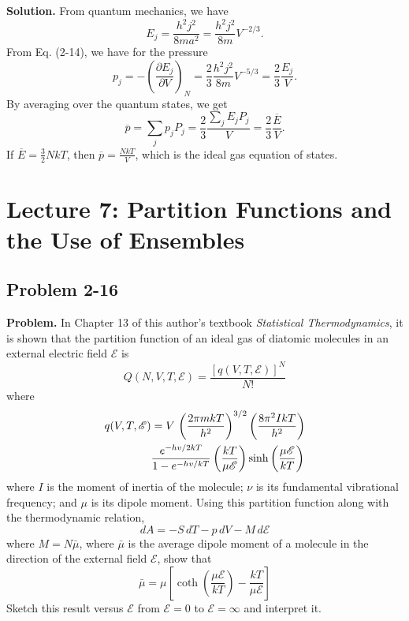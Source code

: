 \documentclass[twocolumn, 10pt]{article}
\numberwithin{equation}{section}
\newenvironment{problem}
{\par\medskip\sffamily \color{problue}
  \textbf{Problem. }\ignorespaces}
{\medskip}
\newenvironment{solution}
{\par\medskip
  \textbf{Solution. }\ignorespaces}
{\medskip}
\begin{document}
\begin{solution}
From quantum mechanics, we have
$$
E_j = \frac{ h^2 j^2 } { 8 m a^2 }
  =
  \frac{ h^2 j^2 } { 8 m } V^{-2/3}.
$$
From Eq. (2-14), we have for the pressure
$$
p_j = -\left( \frac{ \partial E_j } { \partial V } \right)_N
= \frac{2}{3} \frac{ h^2 j^2 } { 8 m } V^{-5/3}
= \frac{2}{3} \frac{ E_j } { V }.
$$
By averaging over the quantum states, we get
$$
  \overline p = \sum_j p_j P_j
  =
  \frac{2}{3} \frac{ \sum_j E_j P_j } { V}
  =
  \frac{2}{3} \frac{ \overline E } { V}.
$$
If $\overline E = \frac{3}{2} N k T$,
then $\overline p = \frac{ N k T } { V}$,
which is the ideal gas equation of states.
\end{solution}

\section{Lecture 7: Partition Functions and the Use of Ensembles}

\subsection{Problem 2-16}

\begin{problem}
In Chapter 13 of this author's textbook
\emph{Statistical Thermodynamics},
it is shown that the partition function of an ideal gas of diatomic molecules
in an external electric field $\mathscr E$ is
$$
Q(N, V, T, \mathscr E) = \frac{ [q(V, T, \mathscr E)]^N } { N! }
$$
where
\begin{align}
  q(V, T, \mathscr E)
  &= V \, \left( \frac{ 2 \pi m k T } { h^2 } \right)^{3/2}
  \left( \frac{ 8\pi^2 I k T } { h^2 } \right)
  \notag \\
  &\frac{ e^{-hv/2kT} } { 1 - e^{-hv/kT} }
  \left( \frac{ kT } { \mu \mathscr E } \right)
  \sinh\left( \frac{ \mu \mathscr E } { k T } \right)
\end{align}
%
where $I$ is the moment of inertia of the molecule;
$\nu$ is its fundamental vibrational frequency;
and $\mu$ is its dipole moment.
%
Using this partition function along with
the thermodynamic relation,
$$
dA = -S \, dT - p \, dV - M \, d\mathscr E
$$
where $M = N \bar\mu$,
where $\bar\mu$ is the average dipole moment
of a molecule in the direction of the external field $\mathscr E$,
show that
%
\begin{equation}
\bar\mu = \mu \left[
  \coth\left( \frac{ \mu \mathscr E } { k T } \right)
  -\frac{ k T } { \mu \mathscr E }
  \right]
\label{eq:mubar}
\end{equation}
%
Sketch this result versus $\mathscr E$
from $\mathscr E = 0$ to $\mathscr E = \infty$
and interpret it.
\end{problem}
\end{document}

